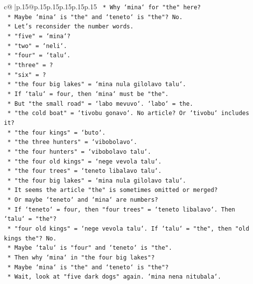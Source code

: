 \documentclass{article}
\begin{document}
{\begin{supertabular}{c@{$\;$}|p{.15\linewidth}@{}p{.15\linewidth}p{.15\linewidth}p{.15\linewidth}p{.15\linewidth}p{.15\linewidth}}
{{{\texttt{    *   Why `mina` for "the" here?} \\
\texttt{    *   Maybe `mina` is "the" and `teneto` is "the"? No.} \\
\texttt{    *   Let's reconsider the number words.} \\
\texttt{    *   "five" = `mina`?} \\
\texttt{    *   "two" = `neli`.} \\
\texttt{    *   "four" = `talu`.} \\
\texttt{    *   "three" = ?} \\
\texttt{    *   "six" = ?} \\
\texttt{    *   "the four big lakes" = `mina nula gilolavo talu`.} \\
\texttt{    *   If `talu` = four, then `mina` must be "the".} \\
\texttt{    *   But "the small road" = `labo mevuvo`. `labo` = the.} \\
\texttt{    *   "the cold boat" = `tivobu gonavo`. No article? Or `tivobu` includes it?} \\
\texttt{    *   "the four kings" = `buto`.} \\
\texttt{    *   "the three hunters" = `vibobolavo`.} \\
\texttt{    *   "the four hunters" = `vibobolavo talu`.} \\
\texttt{    *   "the four old kings" = `nege vevola talu`.} \\
\texttt{    *   "the four trees" = `teneto libalavo talu`.} \\
\texttt{    *   "the four big lakes" = `mina nula gilolavo talu`.} \\
\texttt{    *   It seems the article "the" is sometimes omitted or merged?} \\
\texttt{    *   Or maybe `teneto` and `mina` are numbers?} \\
\texttt{    *   If `teneto` = four, then "four trees" = `teneto libalavo`. Then `talu` = "the"?} \\
\texttt{    *   "four old kings" = `nege vevola talu`. If `talu` = "the", then "old kings the"? No.} \\
\texttt{    *   Maybe `talu` is "four" and `teneto` is "the".} \\
\texttt{    *   Then why `mina` in "the four big lakes"?} \\
\texttt{    *   Maybe `mina` is "the" and `teneto` is "the"?} \\
\texttt{    *   Wait, look at "five dark dogs" again. `mina nena nitubala`.} \\
}}}
\end{supertabular}}
\end{document}
